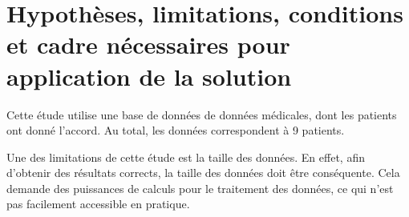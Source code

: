\documentclass[12pt,a4paper]{article}
\begin{document}
\section{Hypothèses, limitations, conditions et cadre nécessaires pour application de la solution}

Cette étude utilise une base de données de données médicales, dont les patients ont donné l'accord. Au total, les données correspondent à 9 patients.

Une des limitations de cette étude est la taille des données. En effet, afin d'obtenir des résultats corrects, la taille des données doit être conséquente. Cela demande des puissances de calculs pour le traitement des données, ce qui n'est pas facilement accessible en pratique.
\end{document}

